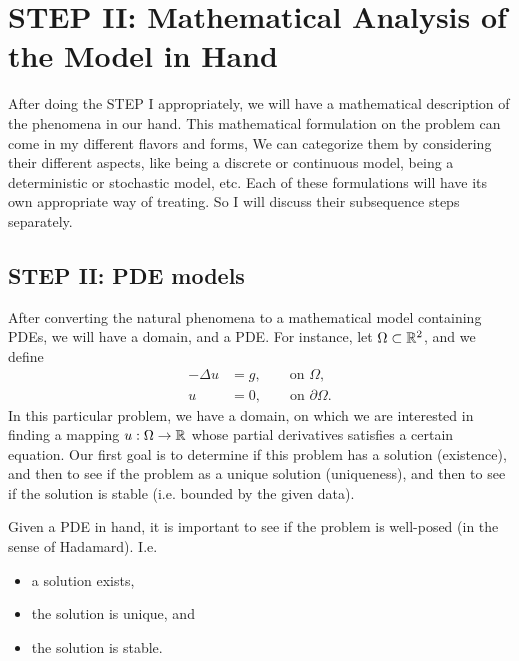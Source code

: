 \FloatBarrier

\section{STEP II: Mathematical Analysis of the Model in Hand}
After doing the STEP I appropriately, we will have a mathematical description of the phenomena in our hand. This mathematical formulation on the problem can come in my different flavors and forms, We can categorize them by considering their different aspects, like being a discrete or continuous model, being a deterministic or stochastic model, etc. Each of these formulations will have its own appropriate way of treating. So I will discuss their subsequence steps separately.
 
 
\subsection{STEP II: PDE models}
After converting the natural phenomena to a mathematical model containing PDEs, we will have a domain, and a PDE. For instance, let $ \Omega \subset \mathbb{R}^2 $, and we define
\begin{align*}
	-\Delta u  &= g, \qquad \text{on }\Omega, \\
	u &= 0, \qquad \text{on } \partial \Omega.
\end{align*}
In this particular problem, we have a domain, on which we are interested in finding a mapping $ u:\Omega \to \mathbb{R} $ whose partial derivatives satisfies a certain equation. Our first goal is to determine if this problem has a solution (existence), and then to see if the problem as a unique solution (uniqueness), and then to see if the solution is stable (i.e. bounded by the given data). 

\begin{summary}
	Given a PDE in hand, it is important to see if the problem is well-posed (in the sense  of Hadamard). I.e.
	\begin{itemize}[noitemsep]
		\item a solution exists,
		\item the solution is unique, and
		\item the solution is stable.
		
	\end{itemize}
\end{summary}

